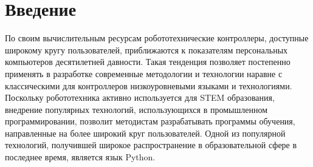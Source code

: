 \documentclass[14pt]{matmex-diploma-custom}
\begin{document}
\maketitle
\tableofcontents
\section*{Введение}
По своим вычислительным ресурсам робототехнические контроллеры, доступные широкому кругу пользователей, приближаются к показателям персональных компьютеров десятилетней давности. Такая тенденция позволяет постепенно применять в разработке современные методологии и технологии наравне с классическими для контроллеров низкоуровневыми языками и технологиями. Поскольку робототехника активно используется для STEM \cite{stemEducation,stemRobotics} образования, внедрение популярных технологий, использующихся в промышленном программировании, позволит методистам разрабатывать программы обучения, направленные на более широкий круг пользователей. Одной из популярной технологий, получившей широкое распространение в образовательной сфере в последнее время, является язык Python.
\end{document}
